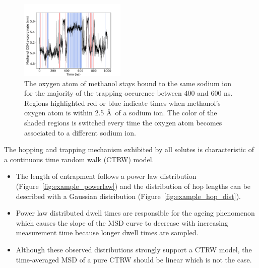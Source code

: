 \documentclass{article}
\begin{document}
  \begin{figure}[!htb]
  \centering
  \includegraphics[width=0.45\textwidth]{na_met_trace.pdf}
  \caption{The oxygen atom of methanol stays bound to the same sodium ion for
  the majority of the trapping occurence between 400 and 600 ns. Regions
  highlighted red or blue indicate times when methanol's oxygen atom is within 
  2.5 \AA~of a sodium ion. The color of the shaded regions is switched every time
  the oxygen atom becomes associated to a different sodium ion.}\label{fig:na_met_trace}
  \end{figure}

  \noindent The hopping and trapping mechanism exhibited by all solutes is characteristic of
  a continuous time random walk (CTRW) model.	
  \begin{itemize}
  	\item The length of entrapment follows a power law distribution 
  	(Figure~\ref{fig:example_powerlaw}) and the distribution of hop lengths can be 
  	described with a Gaussian distribution (Figure~\ref{fig:example_hop_dist}).
  	\item Power law distributed dwell times are responsible for the ageing phenomenon
  	which causes the slope of the MSD curve to decrease with increasing measurement
  	time because longer dwell times are sampled.  %
 	\item Although these observed distributions strongly support a CTRW model, the time-averaged
 	MSD of a pure CTRW should be linear which is not the case.~\cite{neusius_subdiffusion_2008,meroz_subdiffusion_2010}
  \end{itemize}
  
\end{document}
